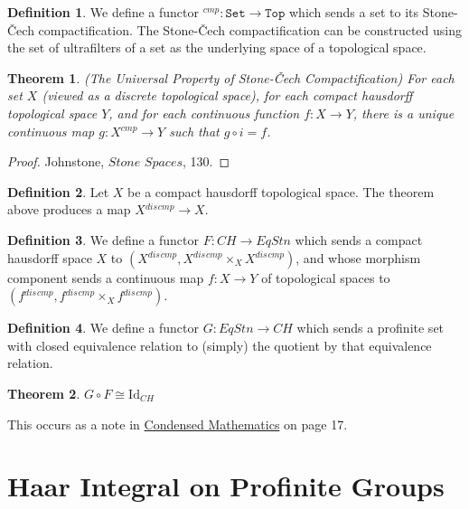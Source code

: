 \documentclass[13pt]{amsart}
\newtheorem{theorem}{Theorem}
\theoremstyle{definition}
\newtheorem{definition}{Definition}
\begin{document}
\begin{definition}
We define a functor ${}^{cmp} : \texttt{Set} \rightarrow \texttt{Top}$ which sends a set to its Stone-Čech compactification. The Stone-Čech compactification can be constructed using the set of ultrafilters of a set as the underlying space of a topological space.
\end{definition}

\begin{theorem}(The Universal Property of Stone-Čech Compactification)
For each set $X$ (viewed as a discrete topological space), for each compact hausdorff topological space $Y$, and for each continuous function $f : X \rightarrow Y$, there is a unique continuous map $g : X{}^{cmp} \rightarrow Y$ such that $g \circ i = f$.
\end{theorem} 

\begin{proof}
Johnstone, $\textit{Stone Spaces}$, 130.
\end{proof}

\begin{definition}
Let $X$ be a compact hausdorff topological space. The theorem above produces a map $X{}^{dis}{}^{cmp} \rightarrow X$.
\end{definition}

\begin{definition}
We define a functor $F : CH \rightarrow EqStn$ which sends a compact hausdorff space $X$ to $(X{}^{dis}{}^{cmp},X{}^{dis}{}^{cmp} \times_{X} X{}^{dis}{}^{cmp})$, and whose morphism component sends a continuous map $f : X \rightarrow Y$ of topological spaces to $(f{}^{dis}{}^{cmp},f{}^{dis}{}^{cmp} \times_{X} f{}^{dis}{}^{cmp})$.
\end{definition}

\begin{definition}
We define a functor $G : EqStn \rightarrow CH$ which sends a profinite set with closed equivalence relation to (simply) the quotient by that equivalence relation.
\end{definition}

\begin{theorem}
$G \circ F \cong \text{Id}_{CH}$
\end{theorem}

This occurs as a note in \href{}{Condensed Mathematics} on page 17.\\



\section{Haar Integral on Profinite Groups}
\end{document}
